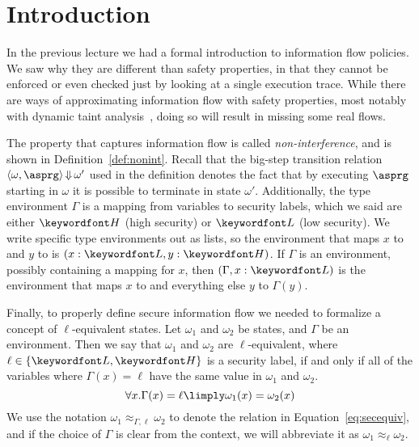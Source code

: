 \documentclass[11pt,twoside]{scrartcl}
\begin{document}
\newcommand{\atrace}{\sigma}%
\newcommand{\stdI}{\dTLint[state=\omega]}%
\newcommand{\Ip}{\dTLint[trace=\atrace]}%
\newcommand{\ws}{\omega}\newcommand{\wt}{\nu}%

\maketitle
\thispagestyle{empty}


\section{Introduction}

In the previous lecture we had a formal introduction to information flow policies. We saw why they are different than safety properties, in that they cannot be enforced or even checked just by looking at a single execution trace. While there are ways of approximating information flow with safety properties, most notably with dynamic taint analysis~\cite{Schwartz2010}, doing so will result in missing some real flows.

The property that captures information flow is called \emph{non-interference}, and is shown in Definition~\ref{def:nonint}. Recall that the big-step transition relation $\langle \omega, \asprg\rangle \bigstep \omega'$ used in the definition denotes the fact that by executing $\asprg$ starting in $\omega$ it is possible to terminate in state $\omega'$. Additionally, the type environment $\Gamma$ is a mapping from variables to security labels, which we said are either $\hisec$ (high security) or $\lowsec$ (low security). We write specific type environments out as lists, so the environment that maps $x$ to \lowsec and $y$ to \hisec is $(x:\lowsec, y:\hisec)$. If $\Gamma$ is an environment, possibly containing a mapping for $x$, then $(\Gamma, x:\lowsec)$ is the environment that maps $x$ to \lowsec and everything else $y$ to $\Gamma(y)$.

Finally, to properly define secure information flow we needed to formalize a concept of $\ell$-equivalent states. Let $\omega_1$ and $\omega_2$ be states, and $\Gamma$ be an environment. Then we say that $\omega_1$ and $\omega_2$ are $\ell$-equivalent, where $\ell \in \{\lowsec,\hisec\}$ is a security label, if and only if all of the variables where $\Gamma(x) = \ell$ have the same value in $\omega_1$ and $\omega_2$.
\begin{equation}
\label{eq:secequiv}
\forall x . \Gamma(x) = \ell \limply \omega_1(x) = \omega_2(x)
\end{equation}
We use the notation $\omega_1 \approx_{\Gamma,\ell} \omega_2$ to denote the relation in Equation~\ref{eq:secequiv}, and if the choice of $\Gamma$ is clear from the context, we will abbreviate it as $\omega_1 \approx_{\ell} \omega_2$.
\end{document}

